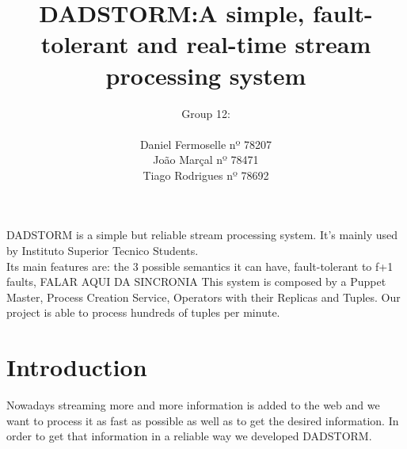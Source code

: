 \documentclass[11pt]{article}
\title{DADSTORM:A simple, fault-tolerant and real-time stream processing system}
\author{Group 12:
\\
\\ Daniel Fermoselle nº 78207
\\ João Marçal nº 78471
\\ Tiago Rodrigues nº 78692
}
\begin{document}
\maketitle
\date

\abstract
DADSTORM is a simple but reliable stream processing system. It's mainly used by Instituto Superior Tecnico Students.
\\Its main features are: the 3 possible semantics it can have, fault-tolerant to f+1 faults, FALAR AQUI DA SINCRONIA
This system is composed by a Puppet Master, Process Creation Service, Operators with their Replicas and Tuples.
Our project is able to process hundreds of tuples per minute.
\section{Introduction}
Nowadays streaming more and more information is added to the web and we want to process it as fast as possible as well as to get the desired information. In order to get that information in a reliable way we developed DADSTORM.
\end{document}
